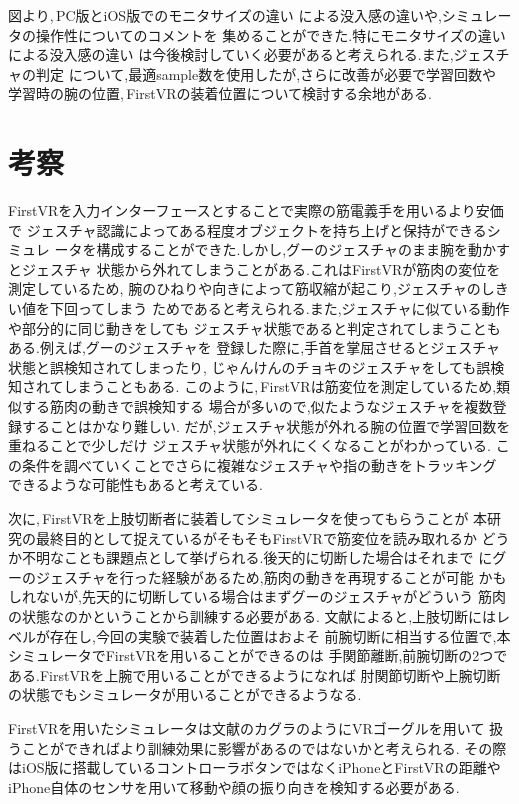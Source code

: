 \documentclass{ltjsreport}
\begin{document}
		図より,\,PC版とiOS版でのモニタサイズの違い
		による没入感の違いや,シミュレータの操作性についてのコメントを
		集めることができた.特にモニタサイズの違いによる没入感の違い
		は今後検討していく必要があると考えられる.また,ジェスチャの判定
		について,最適sample数を使用したが,さらに改善が必要で学習回数や
		学習時の腕の位置,\,FirstVRの装着位置について検討する余地がある.


\chapter{考察}
	FirstVRを入力インターフェースとすることで実際の筋電義手を用いるより安価で
	ジェスチャ認識によってある程度オブジェクトを持ち上げと保持ができるシミュレ
	ータを構成することができた.しかし,グーのジェスチャのまま腕を動かすとジェスチャ
	状態から外れてしまうことがある.これはFirstVRが筋肉の変位を測定しているため,
	腕のひねりや向きによって筋収縮が起こり,ジェスチャのしきい値を下回ってしまう
	ためであると考えられる.また,ジェスチャに似ている動作や部分的に同じ動きをしても
	ジェスチャ状態であると判定されてしまうこともある.例えば,グーのジェスチャを
	登録した際に,手首を掌屈させるとジェスチャ状態と誤検知されてしまったり,
	じゃんけんのチョキのジェスチャをしても誤検知されてしまうこともある.
	このように,\,FirstVRは筋変位を測定しているため,類似する筋肉の動きで誤検知する
	場合が多いので,似たようなジェスチャを複数登録することはかなり難しい.
	だが,ジェスチャ状態が外れる腕の位置で学習回数を重ねることで少しだけ
	ジェスチャ状態が外れにくくなることがわかっている.
	この条件を調べていくことでさらに複雑なジェスチャや指の動きをトラッキング
	できるような可能性もあると考えている.

	次に,\,FirstVRを上肢切断者に装着してシミュレータを使ってもらうことが
	本研究の最終目的として捉えているがそもそもFirstVRで筋変位を読み取れるか
	どうか不明なことも課題点として挙げられる.後天的に切断した場合はそれまで
	にグーのジェスチャを行った経験があるため,筋肉の動きを再現することが可能
	かもしれないが,先天的に切断している場合はまずグーのジェスチャがどういう
	筋肉の状態なのかということから訓練する必要がある.
	文献\cite{ref:8}によると,上肢切断にはレベルが存在し,今回の実験で装着した位置はおよそ
	前腕切断に相当する位置で,本シミュレータでFirstVRを用いることができるのは
	手関節離断,前腕切断の2つである.FirstVRを上腕で用いることができるようになれば
	肘関節切断や上腕切断の状態でもシミュレータが用いることができるようなる.
	
	FirstVRを用いたシミュレータは文献\cite{ref:3}のカグラのようにVRゴーグルを用いて
	扱うことができればより訓練効果に影響があるのではないかと考えられる.
	その際はiOS版に搭載しているコントローラボタンではなくiPhoneとFirstVRの距離や
	iPhone自体のセンサを用いて移動や顔の振り向きを検知する必要がある.
	
\end{document}
